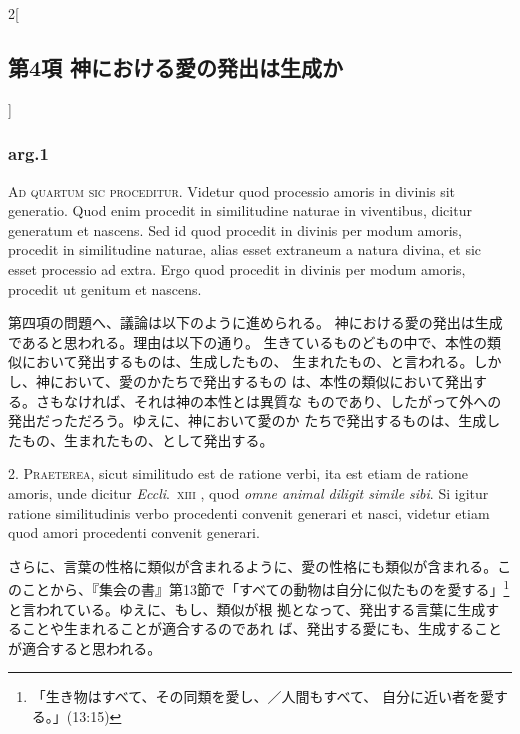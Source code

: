 \documentclass[paper=a4paper,fontsize=10pt,jafontsize=9pt,titlepage]{jlreq}
\begin{document}
\begin{paracol}{2}[\subsection{第4項 神における愛の発出は生成か}]

\subsubsection{arg.1}

{\Huge A}{\scshape d quartum sic proceditur}. Videtur quod processio
 amoris in divinis sit generatio. Quod enim procedit in similitudine
 naturae in viventibus, dicitur generatum et nascens. Sed id quod
 procedit in divinis per modum amoris, procedit in similitudine naturae,
 alias esset extraneum a natura divina, et sic esset processio ad
 extra. Ergo quod procedit in divinis per modum amoris, procedit ut
 genitum et nascens.


\switchcolumn


第四項の問題へ、議論は以下のように進められる。
神における愛の発出は生成であると思われる。理由は以下の通り。
生きているものどもの中で、本性の類似において発出するものは、生成したもの、
 生まれたもの、と言われる。しかし、神において、愛のかたちで発出するもの
 は、本性の類似において発出する。さもなければ、それは神の本性とは異質な
 ものであり、したがって外への発出だっただろう。ゆえに、神において愛のか
 たちで発出するものは、生成したもの、生まれたもの、として発出する。




2. {\scshape Praeterea}, sicut similitudo est de ratione verbi, ita est
 etiam de ratione amoris, unde dicitur {\itshape Eccli}.~{\scshape xiii} , quod {\itshape omne animal
 diligit simile sibi}. Si igitur ratione similitudinis verbo procedenti
 convenit generari et nasci, videtur etiam quod amori procedenti
 convenit generari.


\switchcolumn


さらに、言葉の性格に類似が含まれるように、愛の性格にも類似が含まれる。こ
 のことから、『集会の書』第13節で「すべての動物は自分に似たものを愛する」\footnote{「生き物はすべて、その同類を愛し、／人間もすべて、
 自分に近い者を愛する。」(13:15)}と言われている。ゆえに、もし、類似が根
 拠となって、発出する言葉に生成することや生まれることが適合するのであれ
 ば、発出する愛にも、生成することが適合すると思われる。



\end{paracol}
\end{document}
